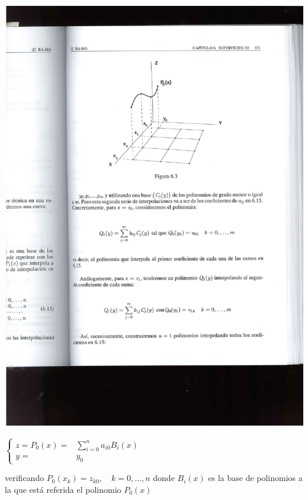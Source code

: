 \documentclass[ebook,oneside]{memoir}
\begin{document}
\begin{minipage}{.35 \textwidth}
\includegraphics[scale=0.55]{6_3.pdf}
\end{minipage} \quad \quad \quad
\begin{minipage}{.4 \textwidth} $\left\{ \begin{array}{rl}
z=P_0(x)=&\sum_{i=0}^n a_{i0} B_i(x)\\
y=&y_0 \end{array} \right.$
\end{minipage}

verificando $P_0(x_k)=z_{k0}, \quad k=0,\ldots,n$ donde $B_i(x)$ es la base de polinomios a la que est\'{a} referida el polinomio $P_0(x)$
\end{document}
